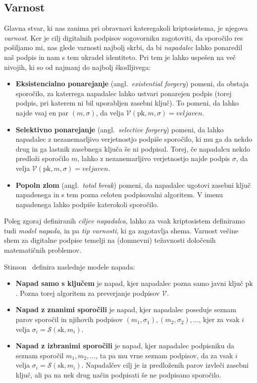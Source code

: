 \documentclass[isrm2, tisk]{fmfdelo}
\begin{document}
\subsection{Varnost}
Glavna stvar, ki nas zanima pri obravnavi kateregakoli kriptosistema, je njegova \textit{varnost}. 
Ker je cilj digitalnih podpisov sogovorniku zagotoviti, da sporočilo res pošiljamo mi, nas glede 
varnosti najbolj skrbi, da bi \textit{napadalec} lahko ponaredil naš podpis in nam s tem ukradel 
identiteto. Pri tem je lahko uspešen na več nivojih, ki so od najmanj do najbolj škodljivega:

\begin{itemize}
    \item \textbf{Eksistencialno ponarejanje} (angl.\ \textit{existential forgery}) pomeni, da obstaja
        sporočilo, za katerrega napadalec lahko ustvari ponarejen podpis (torej podpis, pri katerem
        ni bil uporabljen zasebni ključ). To pomeni, da lahko najde vsaj en par $(m, \sigma)$, da 
        velja $\mathcal{V}(\text{pk}, m, \sigma) = veljaven$.
    \item \textbf{Selektivno ponarejanje} (angl.\ \textit{selective forgery}) pomeni, da lahko napadalec 
        z nezanemarljivo verjetnostjo podpiše sporočilo, ki mu ga da nekdo drug in ga lastnik zasebnega
        ključa še ni podpisal. Torej, če napadalcu nekdo predloži sporočilo $m$, lahko z nezanemarljivo 
        verjetnostjo najde podpis $\sigma$, da velja $\mathcal{V}(\text{pk}, m, \sigma) = veljaven$.
    \item \textbf{Popoln zlom} (angl.\ \textit{total break}) pomeni, da napadalec ugotovi 
        zasebni ključ napadenega in s tem pozna celoten podpisovalni algoritem. V imenu napadenega
        lahko podpiše katerokoli sporočilo.
\end{itemize}

Poleg zgoraj definiranih \textit{ciljev napadalca}, lahko za vsak kriptosistem definiramo tudi
\textit{model napada}, in pa \textit{tip varnosti}, ki ga zagotavlja shema. Varnost večine shem za 
digitalne podpise temelji na (domnevni) težavnosti določenih matematičnih problemov.

Stinson~\cite{stinson2023crypto} definira naslednje modele napada:
\begin{itemize}
    \item \textbf{Napad samo s ključem} je napad, kjer napadalec pozna samo javni ključ $\text{pk}$. 
        Pozna torej algoritem za preverjanje podpisov $\mathcal{V}$.
    \item \textbf{Napad z znanimi sporočili} je napad, kjer napadalec poseduje seznam parov sporočil 
        in njihovih podpisov $(m_1, \sigma_1), (m_2, \sigma_2), \dots$, kjer za vsak $i$ velja 
        $\sigma_i = \mathcal{S}(\text{sk}, m_i)$.
    \item \textbf{Napad z izbranimi sporočili} je napad, kjer napadalec podpisniku da seznam sporočil $m_1,
        m_2, \dots$, ta pa mu vrne seznam podpisov, da za vsak $i$ velja $\sigma_i = \mathcal{S}(\text{sk}, 
        m_i)$. Napadalčev cilj je iz predloženih parov izvleči zasebni ključ, ali pa na nek drug način
        podpisati še ne podpisano sporočilo.
\end{itemize}
\end{document}
